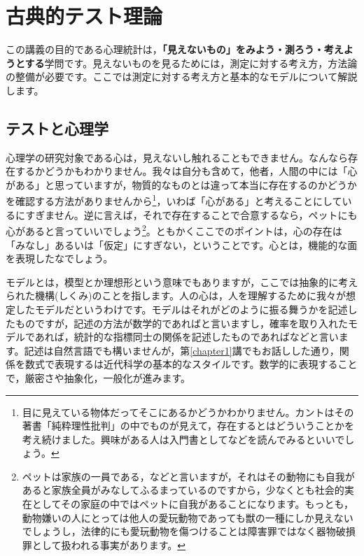 \documentclass{ltjbook}
\begin{document}
 
\chapter{古典的テスト理論} 
\label{chapter6} 

この講義の目的である心理統計は，\textbf{「見えないもの」をみよう・測ろう・考えようとする}学問です。見えないものを見るためには，測定に対する考え方，方法論の整備が必要です。ここでは測定に対する考え方と基本的なモデルについて解説します。
\section{テストと心理学}
心理学の研究対象である心は，見えないし触れることもできません。なんなら存在するかどうかもわかりません。我々は自分も含めて，他者，人間の中には「心がある」と思っていますが，物質的なものとは違って本当に存在するのかどうかを確認する方法がありませんから\footnote{目に見えている物体だってそこにあるかどうかわかりません。カントはその著書「純粋理性批判」\citep{カント1961jo,カント1962ge}の中でものが見えて，存在するとはどういうことかを考え続けました。興味がある人は入門書として\citet{黒崎政男2000}などを読んでみるといいでしょう。}，いわば「心がある」と考えることにしているにすぎません。逆に言えば，それで存在することで合意するなら，ペットにも心があると言っていいでしょう\footnote{ペットは家族の一員である，などと言いますが，それはその動物にも自我があると家族全員がみなしてふるまっているのですから，少なくとも社会的実在としてその家庭の中ではペットに自我があることになります。もっとも，動物嫌いの人にとっては他人の愛玩動物であっても獣の一種にしか見えないでしょうし，法律的にも愛玩動物を傷つけることは障害罪ではなく器物破損罪として扱われる事実があります。}。ともかくここでのポイントは，心の存在は「みなし」あるいは「仮定」にすぎない，ということです。心とは，機能的な面を表現したなでしょう。

モデルとは，模型とか理想形という意味でもありますが，ここでは抽象的に考えられた機構(しくみ)のことを指します。人の心は，人を理解するために我々が想定したモデルだというわけです。モデルはそれがどのように振る舞うかを記述したものですが，記述の方法が数学的であればと言いますし，確率を取り入れたモデルであれば，統計的な指標同士の関係を記述したものであればなどと言います。記述は自然言語でも構いませんが，第\ref{chapter1}講でもお話しした通り，関係を数式で表現するは近代科学の基本的なスタイルです。数学的に表現することで，厳密さや抽象化，一般化が進みます。
\end{document}
